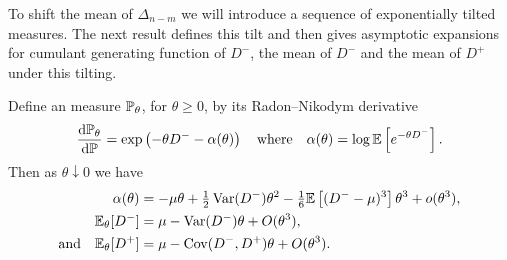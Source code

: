 To shift the mean of $\Delta_{n-m}$ we will introduce a sequence of exponentially tilted measures. The next result defines this tilt and then gives asymptotic expansions for cumulant generating function of $D^-$, the mean of $D^-$ and the mean of $D^+$ under this tilting. 
\begin{lemma}
    \label{lem:asym-expansions}
    Define an measure $\P_{\theta}$, for $\theta \geq 0$, by its Radon--Nikodym derivative
    \begin{equation*}
        \diff{\P_{\theta}}{\P} = \exp\left( - \theta D^- - \alpha(\theta) \right)
        \quad \text{where} \quad
        \alpha(\theta) = \log \E \left[ e^{-\theta D^-} \right].
    \end{equation*}
    Then as $\theta \downarrow 0$ we have
    \begin{align*}
        \alpha(\theta) &= -\mu \theta + \tfrac{1}{2}\var(D^-) \theta^2 - \tfrac{1}{6} \E \left[ (D^- - \mu)^3 \right] \theta^3 + \littleo(\theta^3), \\
        \E_{\theta}[D^-] &= \mu - \var(D^-) \theta + \bigo(\theta^3), \\
        \text{and} \quad \E_{\theta}[D^+] &= \mu - \cov(D^-, D^+) \theta + \bigo(\theta^3).
    \end{align*}
\end{lemma}
